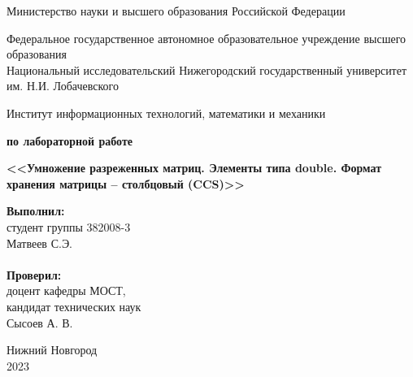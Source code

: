 \documentclass{report}
\begin{document}
\begin{titlepage}

\begin{center}
Министерство науки и высшего образования Российской Федерации
\end{center}

\begin{center}
Федеральное государственное автономное образовательное учреждение высшего образования \\
Национальный исследовательский Нижегородский государственный университет им. Н.И. Лобачевского
\end{center}

\begin{center}
Институт информационных технологий, математики и механики
\end{center}

\vspace{4em}

\begin{center}
\textbf{ по лабораторной работе} \\
\end{center}
\begin{center}
\textbf{\Large<<Умножение разреженных матриц. Элементы типа double. Формат хранения матрицы – столбцовый (CCS)>>} \\
\end{center}

\vspace{4em}

\newbox{\lbox}
\newlength{\maxl}
\setlength{\maxl}{\wd\lbox}
\hfill\parbox{7cm}{
\hspace*{5cm}\hspace*{-5cm}\textbf{Выполнил:} \\ студент группы 382008-3\\Матвеев С.Э.\\
\\
\hspace*{5cm}\hspace*{-5cm}\textbf{Проверил:}\\ доцент кафедры МОСТ, \\ кандидат технических наук \\ Сысоев А. В.\\
}
\vspace{\fill}

\begin{center} Нижний Новгород \\ 2023 \end{center}

\end{titlepage}
\end{document}
